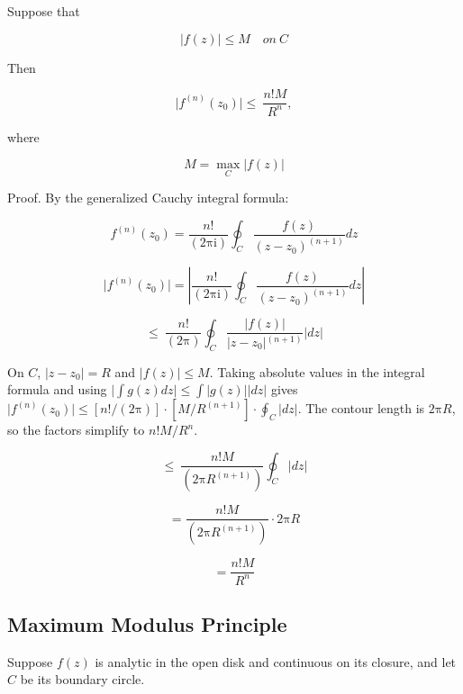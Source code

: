 \documentclass[11pt,a4paper]{article}
\theoremstyle{definition}
\theoremstyle{plain}
\begin{document}
Suppose that

\begin{equation}
\vert{}f(z)\vert{} \le M\quad on\ C
\end{equation}

Then

\begin{equation}
\vert{}f^{(n)}(z_{0})\vert{} \le \ \frac{n!M}{R^{n}},
\end{equation}

where

\begin{equation}
M = \max_{C}\vert{}f(z)\vert{}
\end{equation}

Proof. By the generalized Cauchy integral formula:

\begin{equation}
f^{(n)}(z_{0}) = \frac{n!}{(2\mathrm{\pi}\mathrm{i})}\oint_{C}\frac{f(z)}{(z - z_{0})^{(n + 1)}}dz
\end{equation}

\[
\vert{}f^{(n)}(z_{0})\vert{} = \left\vert{}\frac{n!}{(2\mathrm{\pi}\mathrm{i})}\oint_{C}\frac{f(z)}{(z - z_{0})^{(n + 1)}}dz\right\vert{}
\]

\[
\le \ \frac{n!}{(2\mathrm{\pi})}\oint_{C}\frac{\vert{}f(z)\vert{}}{\vert{}z - z_{0}\vert{}^{(n + 1)}}\vert{}dz\vert{}
\]

On $C$, $\vert{}z - z_{0}\vert{} = R$ and $\vert{}f(z)\vert{} \le M$. Taking absolute values in the integral formula and using $\vert{}\int g(z)dz\vert{} \le \int\vert{}g(z)\vert{}\vert{}dz\vert{}$ gives $\vert{}f^{(n)}(z_{0})\vert{} \le[n!/(2\mathrm{\pi})] \cdot[M/R^{(n + 1)}] \cdot \oint_{C}\vert{}dz\vert{}$. The contour length is $2\mathrm{\pi}R$, so the factors simplify to $n!M/R^{n}$.

\begin{equation}
\le \ \frac{n!M}{(2\mathrm{\pi}R^{(n + 1)})}\oint_{C}\vert{}dz\vert{}
\end{equation}

\[
= \frac{n!M}{(2\mathrm{\pi}R^{(n + 1)})} \cdot 2\mathrm{\pi}R
\]

\[
= \frac{n!M}{R^{n}}
\]

\subsection{Maximum Modulus Principle}

Suppose $f(z)$ is analytic in the open disk and continuous on its closure, and let $C$ be its boundary circle.
\end{document}
